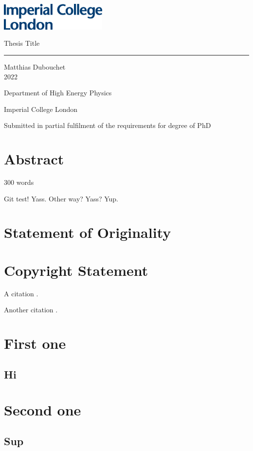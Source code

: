 \documentclass[11pt, a4paper, twoside]{report}
\begin{document}
\includegraphics[width=0.4\textwidth]{IMP_ML_1CS_4CP.eps}
\vfill
\begin{center}
    
    {\huge Thesis Title}
    
    \rule{7cm}{1pt}
    \vspace{2cm}
    
    Matthias Dubouchet\\
    2022
    \vspace{2cm}
    
    Department of High Energy Physics
    
    Imperial College London
    \vspace{2cm}
    
    Submitted in partial fulfilment of the requirements for degree of PhD
    
\end{center}

\vfill
\clearpage

\tableofcontents
\listoffigures
\listoftables
\printglossary[type=\acronymtype]

\chapter*{Abstract}

300 words

Git test! Yass. Other way? Yass? Yup.

\blindtext

\chapter*{Statement of Originality}
\blindtext

\chapter*{Copyright Statement}








A citation \cite{butter_how_2019}.

Another citation \cite{butter_how_2019}.

\appendix
\chapter{First one}
\section{Hi}
\chapter{Second one}
\section{Sup}

\printbibliography
\end{document}
